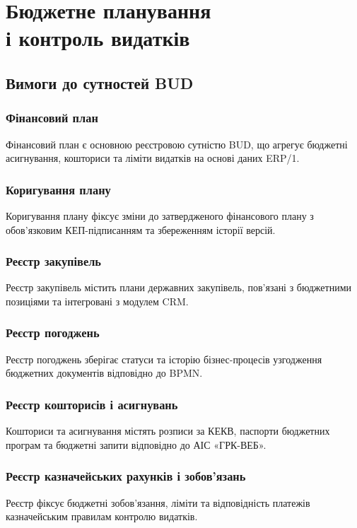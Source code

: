 \documentclass{article}
\begin{document}
\newpage
\section{Бюджетне планування \\ і контроль видатків}

\subsection{Вимоги до сутностей BUD}

\subsubsection{Фінансовий план}
Фінансовий план є основною реєстровою сутністю BUD, що агрегує бюджетні асигнування, кошториси та ліміти видатків на основі даних ERP/1.

\subsubsection{Коригування плану}
Коригування плану фіксує зміни до затвердженого фінансового плану з обов’язковим КЕП-підписанням та збереженням історії версій.

\subsubsection{Реєстр закупівель}
Реєстр закупівель містить плани державних закупівель, пов’язані з бюджетними позиціями та інтегровані з модулем CRM.

\subsubsection{Реєстр погоджень}
Реєстр погоджень зберігає статуси та історію бізнес-процесів узгодження бюджетних документів відповідно до BPMN.

\subsubsection{Реєстр кошторисів і асигнувань}
Кошториси та асигнування містять розписи за КЕКВ, паспорти бюджетних програм та бюджетні запити відповідно до АІС «ГРК-ВЕБ».

\subsubsection{Реєстр казначейських рахунків і зобов’язань}
Реєстр фіксує бюджетні зобов’язання, ліміти та відповідність платежів казначейським правилам контролю видатків.
\end{document}
